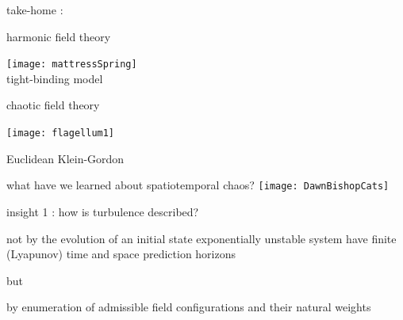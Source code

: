 \begin{frame}{take-home :   }
\begin{center}
            \begin{minipage}[c]{0.40\textwidth}\begin{center}
{\color{purple}harmonic} field theory
\bigskip

\texttt{[image: mattressSpring]}\\
{\color{blue}tight-binding} model
            \end{center}\end{minipage}
            \hspace{2ex}
            \begin{minipage}[c]{0.46\textwidth}\begin{center}
{\color{purple}chaotic} field theory\\
\bigskip
\bigskip
\bigskip

\texttt{[image: flagellum1]}\\
\bigskip

Euclidean {\color{blue}Klein-Gordon}
            \end{center}\end{minipage}
\end{center}
\end{frame}%

\begin{frame}{what have we learned about spatiotemporal chaos?}
\catlatt\hfill\texttt{[image: DawnBishopCats]}
\end{frame} %


\begin{frame}{insight 1 : how is turbulence described?}
\begin{block}{not by the evolution of an initial state}
exponentially unstable system have finite (Lyapunov) time and
space prediction horizons
\end{block}
but
\bigskip

\begin{block}{by enumeration of admissible field configurations}
and their natural weights
\end{block}
\end{frame} %

